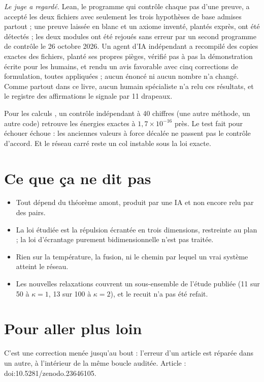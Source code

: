  \emph{Le juge a regardé.} Lean, le programme qui contrôle chaque pas d'une preuve, a accepté les deux
fichiers avec seulement les trois hypothèses de base admises partout ; une preuve laissée en blanc et un axiome
inventé, plantés exprès, ont été détectés ; les deux modules ont été rejoués sans erreur par un second programme de
contrôle le 26 octobre 2026. Un agent d'IA indépendant a recompilé des copies exactes des fichiers, planté ses propres
pièges, vérifié pas à pas la démonstration écrite pour les humains, et rendu un avis favorable avec cinq corrections de
formulation, toutes appliquées ; aucun énoncé ni aucun nombre n'a changé. Comme partout dans ce livre, aucun humain
spécialiste n'a relu ces résultats, et le registre des affirmations le signale par 11 drapeaux.

Pour les calculs , un contrôle indépendant à 40 chiffres (une autre méthode, un autre code) retrouve les
énergies exactes à $1{,}7\times10^{-16}$ près. Le test fait pour échouer échoue : les anciennes valeurs à force
décalée ne passent pas le contrôle d'accord. Et le réseau carré reste un col instable sous la loi exacte.

\section*{Ce que ça ne dit pas}

\begin{limite}
\begin{itemize}
\item Tout dépend du théorème amont, produit par une IA et non encore relu par des pairs.
\item La loi étudiée est la répulsion écrantée en trois dimensions, restreinte au plan ; la loi d'écrantage purement
bidimensionnelle n'est pas traitée.
\item Rien sur la température, la fusion, ni le chemin par lequel un vrai système atteint le réseau.
\item Les nouvelles relaxations couvrent un sous-ensemble de l'étude publiée (11 sur 50 à $\kappa=1$, 13 sur 100 à
$\kappa=2$), et le recuit n'a pas été refait.
\end{itemize}
\end{limite}

\section*{Pour aller plus loin}

C'est une correction menée jusqu'au bout : l'erreur d'un article est réparée dans un autre, à l'intérieur de la même
boucle auditée. Article : doi:10.5281/zenodo.23646105.
